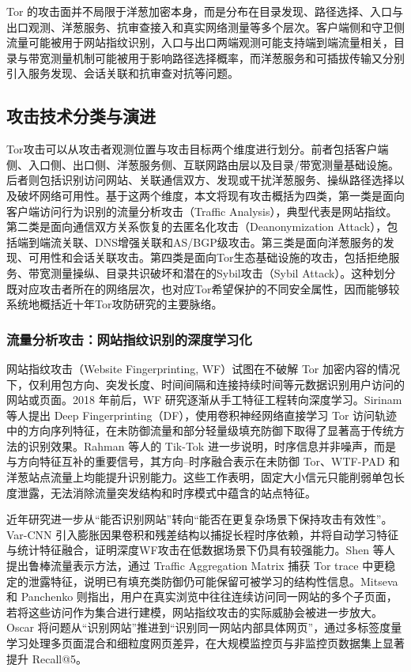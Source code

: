 Tor 的攻击面并不局限于洋葱加密本身，而是分布在目录发现、路径选择、入口与出口观测、洋葱服务、抗审查接入和真实网络测量等多个层次。客户端侧和守卫侧流量可能被用于网站指纹识别，入口与出口两端观测可能支持端到端流量相关，目录与带宽测量机制可能被用于影响路径选择概率，而洋葱服务和可插拔传输又分别引入服务发现、会话关联和抗审查对抗等问题。

\subsection{攻击技术分类与演进}

Tor攻击可以从攻击者观测位置与攻击目标两个维度进行划分。前者包括客户端侧、入口侧、出口侧、洋葱服务侧、互联网路由层以及目录/带宽测量基础设施。后者则包括识别访问网站、关联通信双方、发现或干扰洋葱服务、操纵路径选择以及破坏网络可用性。基于这两个维度，本文将现有攻击概括为四类，第一类是面向客户端访问行为识别的流量分析攻击（Traffic Analysis），典型代表是网站指纹。第二类是面向通信双方关系恢复的去匿名化攻击（Deanonymization Attack），包括端到端流关联、DNS增强关联和AS/BGP级攻击。第三类是面向洋葱服务的发现、可用性和会话关联攻击。第四类是面向Tor生态基础设施的攻击，包括拒绝服务、带宽测量操纵、目录共识破坏和潜在的Sybil攻击（Sybil Attack）。这种划分既对应攻击者所在的网络层次，也对应Tor希望保护的不同安全属性，因而能够较系统地概括近十年Tor攻防研究的主要脉络。

\subsubsection{流量分析攻击：网站指纹识别的深度学习化}

网站指纹攻击（Website Fingerprinting, WF）试图在不破解 Tor 加密内容的情况下，仅利用包方向、突发长度、时间间隔和连接持续时间等元数据识别用户访问的网站或页面。2018 年前后，WF 研究逐渐从手工特征工程转向深度学习。Sirinam 等人提出 Deep Fingerprinting（DF），使用卷积神经网络直接学习 Tor 访问轨迹中的方向序列特征，在未防御流量和部分轻量级填充防御下取得了显著高于传统方法的识别效果\cite{sirinam2018deep}。Rahman 等人的 Tik-Tok 进一步说明，时序信息并非噪声，而是与方向特征互补的重要信号，其方向--时序融合表示在未防御 Tor、WTF-PAD 和洋葱站点流量上均能提升识别能力\cite{rahman2019tik}。这些工作表明，固定大小信元只能削弱单包长度泄露，无法消除流量突发结构和时序模式中蕴含的站点特征。

近年研究进一步从“能否识别网站”转向“能否在更复杂场景下保持攻击有效性”。Var-CNN 引入膨胀因果卷积和残差结构以捕捉长程时序依赖，并将自动学习特征与统计特征融合，证明深度WF攻击在低数据场景下仍具有较强能力\cite{bhat2018var}。Shen 等人提出鲁棒流量表示方法，通过 Traffic Aggregation Matrix 捕获 Tor trace 中更稳定的泄露特征，说明已有填充类防御仍可能保留可被学习的结构性信息\cite{shen2023subverting}。Mitseva 和 Panchenko 则指出，用户在真实浏览中往往连续访问同一网站的多个子页面，若将这些访问作为集合进行建模，网站指纹攻击的实际威胁会被进一步放大\cite{mitseva2024stop}。Oscar 将问题从“识别网站”推进到“识别同一网站内部具体网页”，通过多标签度量学习处理多页面混合和细粒度网页差异，在大规模监控页与非监控页数据集上显著提升 Recall@5\cite{zhao2024towards}。

